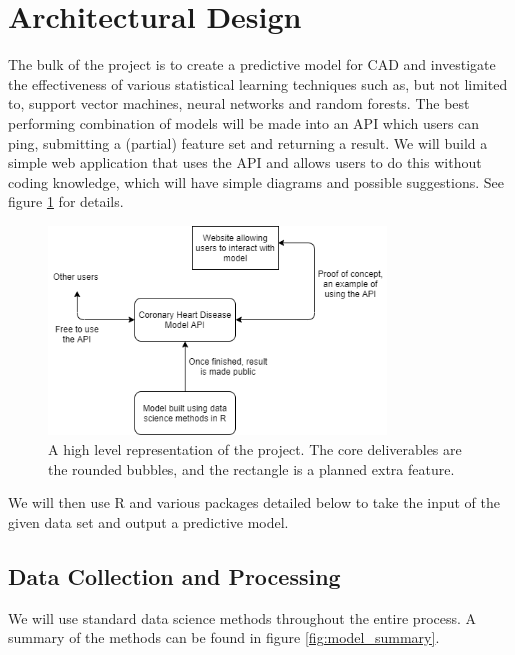\documentclass[a4paper, 12pt]{article}
\begin{document}
\section{Architectural Design} %
The bulk of the project is to create a predictive model for CAD and investigate the effectiveness of various statistical learning techniques such as, but not limited to, support vector machines, neural networks and random forests.
The best performing combination of models will be made into an API which users can ping, submitting a (partial) feature set and returning a result.
We will build a simple web application that uses the API and allows users to do this without coding knowledge, which will have simple diagrams and possible suggestions. See figure \ref{fig:overall_flowchart} for details.

\begin{figure}[h]
    \centering
    \includegraphics[width=0.8\textwidth]{Diagram1.png}
    \caption{A high level representation of the project. The core deliverables are the rounded bubbles, and the rectangle is a planned extra feature.}
    \label{fig:overall_flowchart}
\end{figure}We will then use R and various packages detailed below to take the input of the given data set and output a predictive model.

\subsection{Data Collection and Processing}
We will use standard data science methods throughout the entire process. A summary of the methods can be found in figure \ref{fig:model_summary}.
\end{document}
